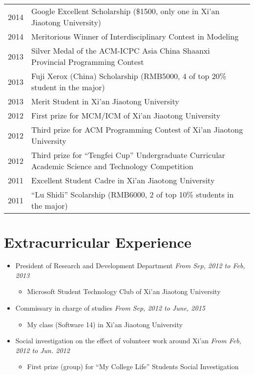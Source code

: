 \documentclass[a4paper,11pt]{article}
\begin{document}
\begin{tabular}{lp{15cm}}
    2014 & Google Excellent Scholarship (\$1500, only one in Xi'an Jiaotong University) \\
    2014 & Meritorious Winner of Interdisciplinary Contest in Modeling \\
    2013 & Silver Medal of the ACM-ICPC Asia China
            \newline Shaanxi Provincial Programming Contest \\
    2013 & Fuji Xerox (China) Scholarship (RMB5000, 4 of top 20\% student in the major) \\
    2013 & Merit Student in Xi'an Jiaotong University \\
    2012 & First prize for MCM/ICM of Xi'an Jiaotong University \\
    2012 & Third prize for ACM Programming Contest of Xi'an Jiaotong University \\
    2012 & Third prize for ``Tengfei Cup'' Undergraduate
            \newline Curricular Academic Science and Technology Competition \\
    2011 & Excellent Student Cadre in Xi'an Jiaotong University  \\
    2011 & ``Lu Shidi'' Scolarship (RMB6000, 2 of top 10\% students in the major)
\end{tabular}


\section{Extracurricular Experience}

\begin{itemize}
    \item President of Research and Development Department \hfill \textit{From Sep, 2012 to Feb, 2013}
    \begin{itemize}
        \item Microsoft Student Technology Club of Xi’an Jiaotong University
    \end{itemize}

    \item Commissary in charge of studies \hfill \textit{From Sep, 2012 to June, 2015}
    \begin{itemize}
        \item My class (Software 14) in Xi’an Jiaotong University
    \end{itemize}

    \item Social investigation on the effect of volunteer work around Xi’an \hfill \textit{From Feb, 2012 to
Jun. 2012}
    \begin{itemize}
        \item First prize (group) for ``My College Life'' Students Social Investigation
    \end{itemize}

\end{itemize}



\end{document}
